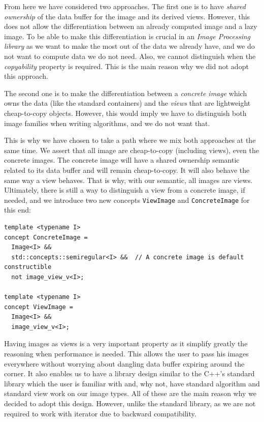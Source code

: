 From here we have considered two approaches. The first one is to have \emph{shared ownership} of the data buffer for the
image and its derived views. However, this does not allow the differentiation between an already computed image and a
lazy image. To be able to make this differentiation is crucial in an \emph{Image Processing library} as we want to make
the most out of the data we already have, and we do not want to compute data we do not need. Also, we cannot distinguish
when the \emph{copyability} property is required. This is the main reason why we did not adopt this approach.

The second one is to make the differentiation between a \emph{concrete image} which owns the data (like the standard
containers) and the \emph{views} that are lightweight cheap-to-copy objects. However, this would imply we have to
distinguish both image families when writing algorithms, and we do not want that.

This is why we have chosen to take a path where we mix both approaches at the same time. We assert that all image are
cheap-to-copy (including views), even the concrete images. The concrete image will have a shared ownership semantic
related to its data buffer and will remain cheap-to-copy. It will also behave the same way a view behaves. That is why,
with our semantic, all images are views. Ultimately, there is still a way to distinguish a view from a concrete image,
if needed, and we introduce two new concepts \texttt{ViewImage} and \texttt{ConcreteImage} for this end:
\begin{verbatim}
template <typename I>
concept ConcreteImage =
  Image<I> &&
  std::concepts::semiregular<I> &&  // A concrete image is default constructible
  not image_view_v<I>;

template <typename I>
concept ViewImage =
  Image<I> &&
  image_view_v<I>;
\end{verbatim}
Having images as views is a very important property as it simplify greatly the reasoning when performance is needed.
This allows the user to pass his images everywhere without worrying about dangling data buffer expiring around the
corner. It also enables us to have a library design similar to the C++'s standard library which the user is familiar
with and, why not, have standard algorithm and standard view work on our image types. All of these are the main reason
why we decided to adopt this design. However, unlike the standard library, as we are not required to work with iterator
due to backward compatibility.

